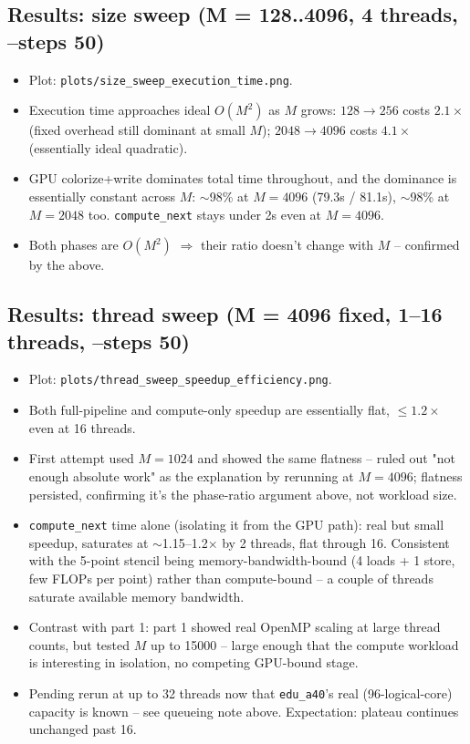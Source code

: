 \subsection{Results: size sweep (M = 128..4096, 4 threads, --steps 50)}
\begin{itemize}
\item Plot: \texttt{plots/size\_sweep\_execution\_time.png}.
\item Execution time approaches ideal $O(M^2)$ as $M$ grows: $128\to256$ costs $2.1\times$ (fixed overhead still dominant at small $M$); $2048\to4096$ costs $4.1\times$ (essentially ideal quadratic).
\item GPU colorize+write dominates total time throughout, and the dominance is essentially constant across $M$: $\sim$98\% at $M=4096$ (79.3s / 81.1s), $\sim$98\% at $M=2048$ too. \texttt{compute\_next} stays under 2s even at $M=4096$.
\item Both phases are $O(M^2)$ $\Rightarrow$ their ratio doesn't change with $M$ -- confirmed by the above.
\end{itemize}

\subsection{Results: thread sweep (M = 4096 fixed, 1--16 threads, --steps 50)}
\begin{itemize}
\item Plot: \texttt{plots/thread\_sweep\_speedup\_efficiency.png}.
\item Both full-pipeline and compute-only speedup are essentially flat, $\leq 1.2\times$ even at 16 threads.
\item First attempt used $M=1024$ and showed the same flatness -- ruled out "not enough absolute work" as the explanation by rerunning at $M=4096$; flatness persisted, confirming it's the phase-ratio argument above, not workload size.
\item \texttt{compute\_next} time alone (isolating it from the GPU path): real but small speedup, saturates at $\sim$1.15--1.2$\times$ by 2 threads, flat through 16. Consistent with the 5-point stencil being memory-bandwidth-bound (4 loads + 1 store, few FLOPs per point) rather than compute-bound -- a couple of threads saturate available memory bandwidth.
\item Contrast with part 1: part 1 showed real OpenMP scaling at large thread counts, but tested $M$ up to 15000 -- large enough that the compute workload is interesting in isolation, no competing GPU-bound stage.
\item Pending rerun at up to 32 threads now that \texttt{edu\_a40}'s real (96-logical-core) capacity is known -- see queueing note above. Expectation: plateau continues unchanged past 16.
\end{itemize}

